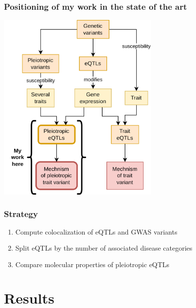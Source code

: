 \documentclass{beamer}
\begin{document}
    \begin{frame}
        \frametitle{Positioning of my work in the state of the art}

        \begin{center}
            \includegraphics[width=0.6\textwidth]{fig/graphical_intro_approach.drawio.png}
        \end{center}

    \end{frame}

    \begin{frame}
        \frametitle{Strategy}

        \begin{enumerate}
            \item Compute colocalization of eQTLs and GWAS variants
            \item Split eQTLs by the number of associated disease categories
            \item Compare molecular properties of pleiotropic eQTLs
        \end{enumerate}

    \end{frame}


    \section{Results} %
\end{document}
